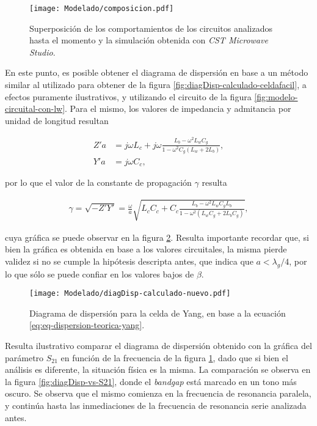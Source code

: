 \begin{figure}[h]
	\centering
	\texttt{[image: Modelado/composicion.pdf]}
	\caption{Superposición de los comportamientos de los circuitos analizados hasta el momento y la simulación obtenida con \textit{CST Microwave Studio}.}
	\label{fig:modelo-circuital-resonancia-serie-graficos}
\end{figure}

En este punto, es posible obtener el diagrama de dispersión en base a un método similar al utilizado para obtener de la figura \ref{fig:diagDisp-calculado-celdafacil}, a efectos puramente ilustrativos, y utilizando el circuito de la figura \ref{fig:modelo-circuital-con-lw}. Para el mismo, los valores de impedancia y admitancia por unidad de longitud resultan

\begin{align}
	Z' a &= j\omega L_c + j\omega \frac{L_b - \omega^2 L_w C_g}{1-\omega^2 C_g (L_w + 2 L_b)}, \\
	Y' a &= j \omega C_c,
\end{align}

por lo que el valor de la constante de propagación $\gamma$ resulta

\begin{align}
	\label{eq:eq-dispersion-teorica-yang}
	\gamma = \sqrt{-Z' Y'} = \frac{\omega}{a} \sqrt{L_c C_c + C_c \frac{L_b - \omega^2 L_w C_g L_b}{1-\omega^2(L_w C_g + 2 L_b C_g)}},
\end{align}

cuya gráfica se puede observar en la figura \ref{fig:grafica-diagdisp-celdaYang-teorica}. Resulta importante recordar que, si bien la gráfica es obtenida en base a los valores circuitales, la misma pierde validez si no se cumple la hipótesis descripta antes, que indica que $a < \lambda_g/4$, por lo que sólo se puede confiar en los valores bajos de $\beta$.

\begin{figure}[h]
	\centering
	\texttt{[image: Modelado/diagDisp-calculado-nuevo.pdf]}
	\caption{Diagrama de dispersión para la celda de Yang, en base a la ecuación \ref{eq:eq-dispersion-teorica-yang}.}
	\label{fig:grafica-diagdisp-celdaYang-teorica}
\end{figure}

Resulta ilustrativo comparar el diagrama de dispersión obtenido con la gráfica del parámetro $S_{21}$ en función de la frecuencia de la figura \ref{fig:modelo-circuital-resonancia-serie-graficos}, dado que si bien el análisis es diferente, la situación física es la misma. La comparación se observa en la figura \ref{fig:diagDisp-vs-S21}, donde el \textit{bandgap} está marcado en un tono más oscuro. Se observa que el mismo comienza en la frecuencia de resonancia paralela, y continúa hasta las inmediaciones de la frecuencia de resonancia serie analizada antes.

